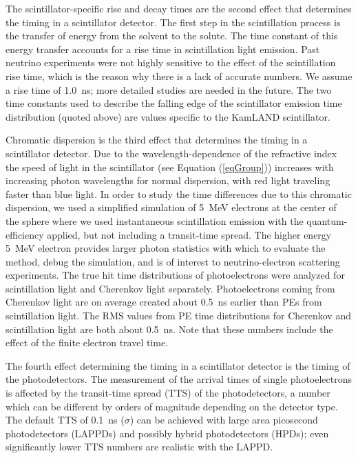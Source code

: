 \documentclass[cits]{JINST}
\begin{document}
The scintillator-specific rise and decay times are the second effect that determines the timing in a scintillator detector. The first step in the scintillation process is the transfer of energy from the solvent to the solute. The time constant of this
energy transfer accounts for a rise time in scintillation light
emission. Past neutrino experiments were not highly sensitive to the
effect of the scintillation rise time, which is the reason why there
is a lack of accurate numbers. We assume a rise time of 1.0~ns; more
detailed studies are needed in the future. The two time constants used
to describe the falling edge of the scintillator emission time
distribution (quoted above) are values specific to the KamLAND
scintillator.

Chromatic dispersion is the third effect that determines the timing in a scintillator detector. Due to the wavelength-dependence of the refractive index the speed of
light in the scintillator (see Equation (\ref{eqGroup})) increases
with increasing photon wavelengths for normal dispersion, with red
light traveling faster than blue light.  In order to study the time differences due to this chromatic dispersion, we used a simplified simulation of 5~MeV electrons at
the center of the sphere where we used instantaneous scintillation
emission with the quantum-efficiency applied, but not including a
transit-time spread. The higher energy 5~MeV electron provides larger photon statistics with which to evaluate the method, debug the simulation, and is of interest to neutrino-electron scattering experiments. The true hit time distributions of photoelectrons
were analyzed for scintillation light and Cherenkov light
separately. Photoelectrons coming from Cherenkov light are on average
created about 0.5~ns earlier than PEs from scintillation light. The
RMS values from PE time distributions for Cherenkov and scintillation
light are both about 0.5~ns. Note that these numbers include the
effect of the finite electron travel time.

The fourth effect determining the timing in a scintillator detector is the timing of the photodetectors. The measurement of the arrival times of single photoelectrons is
affected by the transit-time spread (TTS) of the photodetectors, a
number which can be different by orders of magnitude depending on the
detector type. The default TTS of 0.1~ns ($\sigma$) can be achieved with large area picosecond photodetectors
(LAPPDs)\cite{Adams:2013nva,RSI_paper,PSEC4_paper,anode_paper} and possibly hybrid photodetectors
(HPDs)\cite{hpdThesis}; even significantly lower TTS numbers are
realistic with the LAPPD\cite{RSI_paper,PSEC4_paper,anode_paper}.
\end{document}
